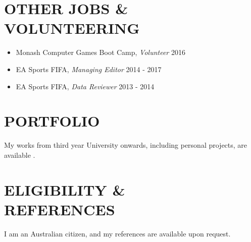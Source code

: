 \documentclass[margin, 10pt]{res} %
\begin{document}
\begin{resume}
\begin{itemize}
\end{itemize}


\section{OTHER JOBS \& \\ VOLUNTEERING} 

\begin{itemize} \itemsep -11pt

\item Monash Computer Games Boot Camp, {\sl Volunteer} \hfill 2016 \\
\item EA Sports FIFA, {\sl Managing Editor} \hfill 2014 - 2017\\
\item EA Sports FIFA, {\sl Data Reviewer} \hfill 2013 - 2014 \\
 
\end{itemize}




\section{PORTFOLIO} 

My works from third year University onwards, including personal projects, are available \underline{}.


\section{ELIGIBILITY \& \\ REFERENCES} 

I am an Australian citizen, and my references are available upon request.



\end{resume}
\end{document}

